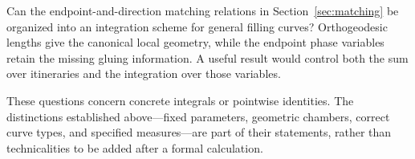\begin{question}
Can the endpoint-and-direction matching relations in
Section~\ref{sec:matching} be organized into an integration scheme for
general filling curves? Orthogeodesic lengths give the canonical local
geometry, while the endpoint phase variables retain the missing gluing
information. A useful result would control both the sum over itineraries
and the integration over those variables.
\end{question}

These questions concern concrete integrals or pointwise identities. The
distinctions established above---fixed parameters, geometric chambers,
correct curve types, and specified measures---are part of their statements,
rather than technicalities to be added after a formal calculation.

